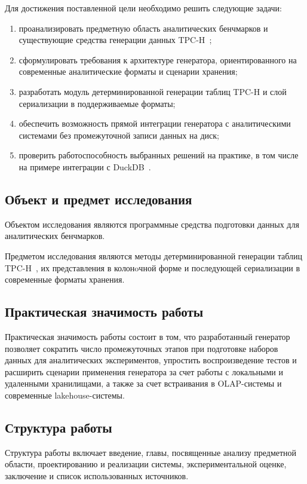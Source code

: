 Для достижения поставленной цели необходимо решить следующие задачи:
\begin{enumerate}
    \item проанализировать предметную область аналитических бенчмарков и
    существующие средства генерации данных TPC-H~\cite{tpch-spec};
    \item сформулировать требования к архитектуре генератора, ориентированного
    на современные аналитические форматы и сценарии хранения;
    \item разработать модуль детерминированной генерации таблиц TPC-H и слой
    сериализации в поддерживаемые форматы;
    \item обеспечить возможность прямой интеграции генератора с аналитическими
    системами без промежуточной записи данных на диск;
    \item проверить работоспособность выбранных решений на практике, в том
    числе на примере интеграции с DuckDB~\cite{schengen-duckdb-repo}.
\end{enumerate}

\subsection*{Объект и предмет исследования}

Объектом исследования являются программные средства подготовки данных для
аналитических бенчмарков.

Предметом исследования являются методы детерминированной генерации таблиц
TPC-H~\cite{tpch-spec}, их представления в колонoчной форме и последующей сериализации в
современные форматы хранения.

\subsection*{Практическая значимость работы}

Практическая значимость работы состоит в том, что разработанный генератор
позволяет сократить число промежуточных этапов при подготовке наборов данных
для аналитических экспериментов, упростить воспроизведение тестов и расширить
сценарии применения генератора за счет работы с локальными и удаленными
хранилищами, а также за счет встраивания в OLAP-системы и современные
lakehouse-системы.

\subsection*{Структура работы}

Структура работы включает введение, главы, посвященные анализу предметной
области, проектированию и реализации системы, экспериментальной оценке,
заключение и список использованных источников.
